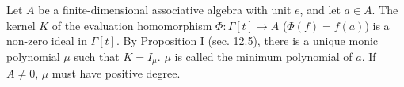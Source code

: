 Let $A$ be a finite-dimensional associative algebra with unit $e$, and let $a \in A$. The kernel $K$ of the evaluation homomorphism $\Phi: \Gamma[t] \to A$ ($\Phi(f) = f(a)$) is a non-zero ideal in $\Gamma[t]$. By Proposition I (sec. 12.5), there is a unique monic polynomial $\mu$ such that $K = I_{\mu}$. $\mu$ is called the minimum polynomial of $a$. If $A \neq 0$, $\mu$ must have positive degree.
